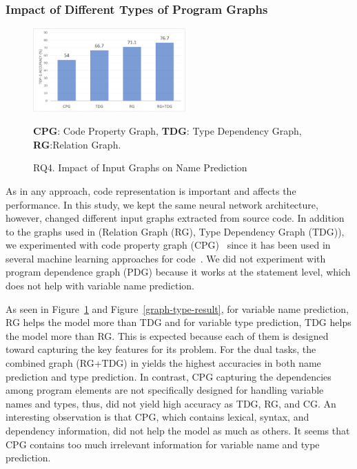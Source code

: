 \subsubsection{Impact of Different Types of Program Graphs}
\label{sec:graphs}

\begin{figure}[t]%
\begin{center}
\includegraphics[width=2.3in]{figures/sensi-graphs-name-2}
\vspace{-8pt}
\caption{RQ4. Impact of Input Graphs on Name Prediction}
\label{graph-name-result}
{\bf CPG}: Code Property Graph, {\bf TDG}: Type Dependency Graph, {\bf RG}:Relation Graph. 
\end{center}
\end{figure}



As in any approach, code representation is
important and affects the performance. In this study, we
kept the same neural network architecture, however, changed different
input graphs extracted from source code. In addition to the graphs
used in {\tool} (Relation Graph (RG), Type Dependency Graph (TDG)), we
experimented with code property graph (CPG)~\cite{CPG-2014} since
it has been used in several machine learning approaches for
code~\cite{CPG-2014}. We did not experiment with program dependence
graph (PDG) because it works at the statement level, which does not
help with variable name prediction.

As seen in Figure~\ref{graph-name-result} and
Figure~\ref{graph-type-result}, for variable name prediction, RG helps
the model more than TDG and for variable type prediction, TDG helps
the model more than RG. This is expected because each of them is
designed toward capturing the key features for its problem. For the
dual tasks, the combined graph (RG+TDG) in {\tool} yields the highest
accuracies in both name prediction and type prediction. In contrast,
CPG capturing the dependencies among program elements are not
specifically designed for handling variable names and types, thus, did not
yield high accuracy as TDG, RG, and CG. An interesting observation is
that CPG, which contains lexical, syntax, and dependency information,
did not help the model as much as others. It seems that CPG contains
too much irrelevant information for variable name and type prediction.

